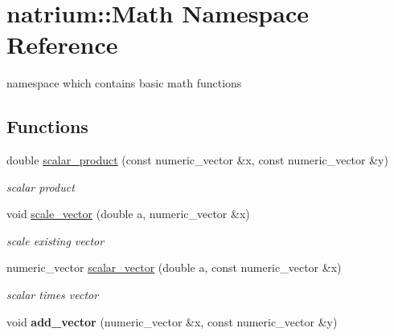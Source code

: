 \hypertarget{namespacenatrium_1_1Math}{\section{natrium\-:\-:Math Namespace Reference}
\label{namespacenatrium_1_1Math}
}


namespace which contains basic math functions  


\subsection*{Functions}
\begin{DoxyCompactItemize}
\item 
\hypertarget{namespacenatrium_1_1Math_a60a79394533003516ee1895b0cb93c73}{double \hyperlink{namespacenatrium_1_1Math_a60a79394533003516ee1895b0cb93c73}{scalar\-\_\-product} (const numeric\-\_\-vector \&x, const numeric\-\_\-vector \&y)}\label{namespacenatrium_1_1Math_a60a79394533003516ee1895b0cb93c73}

\begin{DoxyCompactList}\small\item\em scalar product \end{DoxyCompactList}\item 
\hypertarget{namespacenatrium_1_1Math_a951fe967a78de6add632ac1944465bf3}{void \hyperlink{namespacenatrium_1_1Math_a951fe967a78de6add632ac1944465bf3}{scale\-\_\-vector} (double a, numeric\-\_\-vector \&x)}\label{namespacenatrium_1_1Math_a951fe967a78de6add632ac1944465bf3}

\begin{DoxyCompactList}\small\item\em scale existing vector \end{DoxyCompactList}\item 
\hypertarget{namespacenatrium_1_1Math_af6c85a423e8c6ec87858a3d48669a271}{numeric\-\_\-vector \hyperlink{namespacenatrium_1_1Math_af6c85a423e8c6ec87858a3d48669a271}{scalar\-\_\-vector} (double a, const numeric\-\_\-vector \&x)}\label{namespacenatrium_1_1Math_af6c85a423e8c6ec87858a3d48669a271}

\begin{DoxyCompactList}\small\item\em scalar times vector \end{DoxyCompactList}\item 
\hypertarget{namespacenatrium_1_1Math_adce2097ce0c14661aac3eaff3a03e183}{void {\bfseries add\-\_\-vector} (numeric\-\_\-vector \&x, const numeric\-\_\-vector \&y)}\label{namespacenatrium_1_1Math_adce2097ce0c14661aac3eaff3a03e183}


\end{DoxyCompactItemize}
